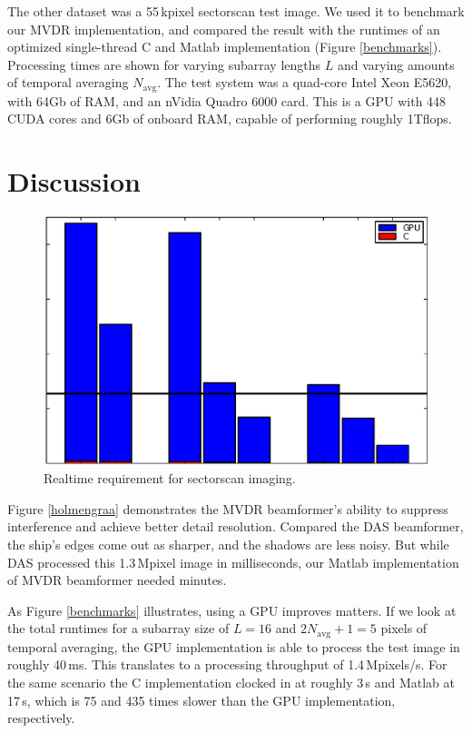 \documentclass[12pt,journal,captionsoff,onecolumn]{IEEEtran}
\let\MYoriglatexcaption\caption               %
\renewcommand{\caption}[2][\relax]{\MYoriglatexcaption[#2]{#2}}
\newcommand\Fig[1]{Figure \ref{#1}}
\newcommand\1{\vec 1}
\begin{document}
The other dataset was a 55\,kpixel sectorscan test image. We used it to benchmark our \gls{MVDR} implementation, and compared the result with the runtimes of an optimized single-thread C and Matlab implementation (\Fig{benchmarks}). Processing times are shown for varying subarray lengths $L$ and varying amounts of temporal averaging $N_\text{avg}$. The test system was a quad-core Intel Xeon E5620, with 64Gb of \gls{RAM}, and an nVidia Quadro 6000 card. This is a \gls{GPU} with 448 \gls{CUDA} cores and 6Gb of onboard \gls{RAM}, capable of performing roughly 1Tflops.

\section{Discussion}

\begin{figure}[!t]
\centering
\includegraphics[width=\linewidth]{gfx/benchmark_tagged.eps}
\caption{Realtime requirement for sectorscan imaging.}\label{realtime_sectorscan}
\end{figure}

Figure \ref{holmengraa} demonstrates the \gls{MVDR} beamformer's ability to suppress interference and achieve better detail resolution. Compared the \gls{DAS} beamformer, the ship's edges come out as sharper, and the shadows are less noisy. But while \gls{DAS} processed this 1.3\,Mpixel image in milliseconds, our Matlab implementation of \gls{MVDR} beamformer needed minutes.

As Figure \ref{benchmarks} illustrates, using a \gls{GPU} improves matters. If we look at the total runtimes for a subarray size of $L=16$ and $2N_\text{avg}+1=5$ pixels of temporal averaging, the \gls{GPU} implementation is able to process the test image in roughly 40\,ms. This translates to a processing throughput of 1.4\,Mpixels/s. For the same scenario the C implementation clocked in at roughly 3\,s and Matlab at 17\,s, which is 75 and 435 times slower than the \gls{GPU} implementation, respectively.
\end{document}
